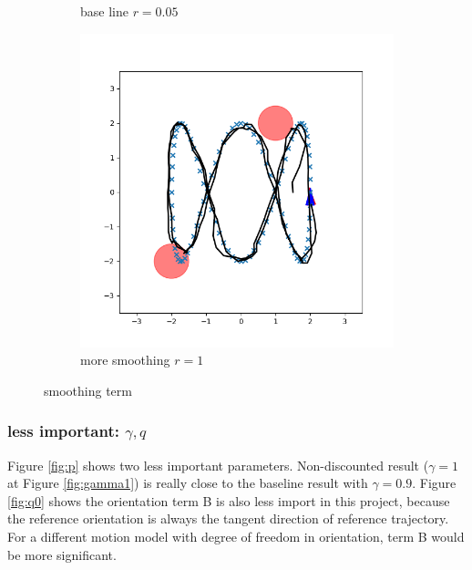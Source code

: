 \documentclass[conference]{IEEEtran}
\begin{document}
\begin{figure}[h]
\begin{subfigure}[b]{0.3\textwidth}
        \caption{base line $r=0.05$}
        \label{fig:r005}
    \end{subfigure}
    \hfill
    \begin{subfigure}[b]{0.3\textwidth}
        \includegraphics[width=\textwidth]{../fig/trajectory.cec.r_1.png}
        \caption{more smoothing $r=1$}
        \label{fig:r1}
    \end{subfigure}
    \caption{smoothing term}
    \label{fig:r}
\end{figure}

\subsubsection{less important: $\gamma, q$}
Figure \ref{fig:p} shows two less important parameters.
Non-discounted result ($\gamma = 1$ at Figure \ref{fig:gamma1}) is really close to the baseline result with $\gamma = 0.9$.
Figure \ref{fig:q0} shows the orientation term B is also less import in this project,
because the reference orientation is always the tangent direction of reference trajectory.
For a different motion model with degree of freedom in orientation, term B would be more significant.
\end{document}

